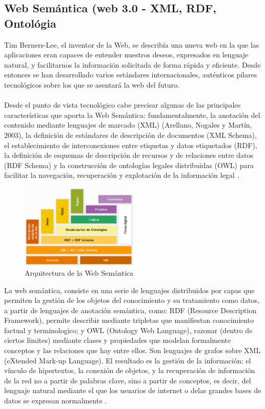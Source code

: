 \documentclass[conference]{IEEEtran}\usepackage[]{graphicx}\usepackage[]{color}
\begin{document}
\subsection{Web Semántica (web 3.0 - XML, RDF, Ontológia}  
Tim Berners-Lee, el inventor de la Web, se describía una nueva web en la que las aplicaciones eran capaces de entender nuestros deseos, expresados en lenguaje natural, y facilitarnos la información solicitada de forma rápida y eficiente. Desde entonces se han desarrollado varios estándares internacionales, auténticos pilares tecnológicos sobre los que se asentará la web del futuro.\\ \\
Desde el punto de vista tecnológico cabe precisar algunas de las principales características que aporta la Web Semántica: fundamentalmente, la anotación del contenido mediante lenguajes de marcado (XML) (Arellano, Nogales y Martín, 2003), la definición de estándares de descripción de documentos (XML Schema), el establecimiento de interconexiones entre etiquetas y datos etiquetados (RDF), la definición de esquemas de descripción de recursos y de relaciones entre datos (RDF Schema) y la construcción de ontologías legales distribuidas (OWL) para facilitar la navegación, recuperación y explotación de la información legal \cite{biblio2}.
\begin{figure}[h]
	\centering
	\includegraphics[width=0.5\textwidth]{ws-arquitectura2}
	\caption{Arquitectura de la Web Semántica}
\end{figure}
La web semántica, consiste en una serie de lenguajes distribuidos por capas que permiten la gestión de los objetos del conocimiento y su tratamiento como datos, a partir de lenguajes de anotación semántica, como: RDF (Resource Description Framework), permite describir mediante tripletas que manifiestan conocimiento factual y terminologico; y OWL (Ontology Web Language), razonar (dentro de ciertos límites) mediante clases y propiedades que modelan formalmente conceptos y las relaciones que hay entre ellos. Son lenguajes de grafos sobre XML (eXtended Mark-up Language).  El resultado es la gestión de la información: el vínculo de hipertextos, la conexión de objetos, y la recuperación de información de la red no a partir de palabras clave, sino a partir de conceptos, es decir, del lenguaje natural mediante el que los usuarios de internet o delas grandes bases de datos se expresan normalmente \cite{biblio3}. \\ \\
\end{document}
